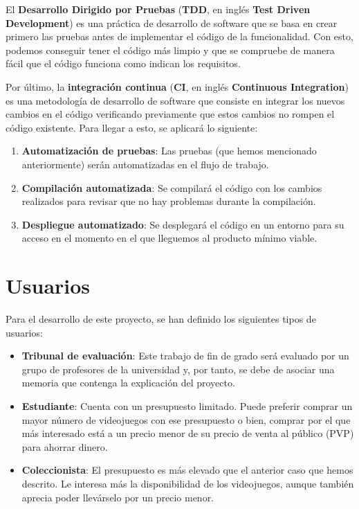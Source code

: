 El \textbf{Desarrollo Dirigido por Pruebas} (\textbf{TDD}, en inglés \textbf{Test 
Driven Development}) \cite{tdd} es una práctica de desarrollo de software que se 
basa en crear primero las pruebas antes de implementar el código de la 
funcionalidad. Con esto, podemos conseguir tener el código más limpio y que se 
compruebe de manera fácil que el código funciona como indican los requisitos.

Por último, la \textbf{integración continua} (\textbf{CI}, en inglés 
\textbf{Continuous Integration}) \cite{ci} es una metodología de desarrollo de 
software que consiste en integrar los nuevos cambios en el código verificando 
previamente que estos cambios no rompen el código existente. Para llegar a esto, se 
aplicará lo siguiente:

\begin{enumerate}
    \item \textbf{Automatización de pruebas}: Las pruebas (que hemos mencionado 
    anteriormente) serán automatizadas en el flujo de trabajo.
    \item \textbf{Compilación automatizada}: Se compilará el código con los cambios 
    realizados para revisar que no hay problemas durante la compilación.
    \item \textbf{Despliegue automatizado}: Se desplegará el código en un entorno 
    para su acceso en el momento en el que lleguemos al producto mínimo viable.
\end{enumerate}

\section{Usuarios}

Para el desarrollo de este proyecto, se han definido los siguientes tipos de 
usuarios:

\begin{itemize}
    \item \textbf{Tribunal de evaluación}: Este trabajo de fin de grado será 
    evaluado por un grupo de profesores de la universidad y, por tanto, se debe de 
    asociar una memoria que contenga la explicación del proyecto.
    \item \textbf{Estudiante}: Cuenta con un presupuesto limitado. Puede preferir 
    comprar un mayor número de videojuegos con ese presupuesto o bien, comprar por 
    el que más interesado está a un precio menor de su precio de venta al público 
    (PVP) para ahorrar dinero.
    \item \textbf{Coleccionista}: El presupuesto es más elevado que el anterior 
    caso que hemos descrito. Le interesa más la disponibilidad de los videojuegos, 
    aunque también aprecia poder llevárselo por un precio menor.
\end{itemize}

